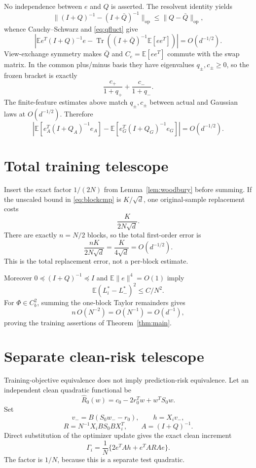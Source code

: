\documentclass[11pt]{article}
\newcommand{\E}{\mathbb E}
\newcommand{\op}{\mathrm{op}}
\newcommand{\tr}{\operatorname{Tr}}
\begin{document}
No independence between \(e\) and \(Q\) is asserted.  The resolvent identity yields
\[
 \|(I+Q)^{-1}-(I+\bar Q)^{-1}\|_{\op}\le\|Q-\bar Q\|_{\op},
\]
whence Cauchy--Schwarz and \eqref{eq:qfluct} give
\begin{equation}\label{eq:freeze}
 \left|\E e^T(I+Q)^{-1}e-
 \tr\left((I+\bar Q)^{-1}\E[ee^T]\right)\right|=O(d^{-1/2}).
\end{equation}
View-exchange symmetry makes \(\bar Q\) and \(C_e=\E[ee^T]\) commute with the swap matrix.  In the common plus/minus basis they have eigenvalues \(q_\pm,c_\pm\ge0\), so the frozen bracket is exactly
\[
 \frac{c_+}{1+q_+}+\frac{c_-}{1+q_-}.
\]
The finite-feature estimates above match \(q_\pm,c_\pm\) between actual and Gaussian laws at \(O(d^{-1/2})\).  Therefore
\begin{equation}\label{eq:blockcmp}
 \left|\E[e_A^T(I+Q_A)^{-1}e_A]
 -\E[e_G^T(I+Q_G)^{-1}e_G]\right|=O(d^{-1/2}).
\end{equation}

\section{Total training telescope}
Insert the exact factor \(1/(2N)\) from Lemma~\ref{lem:woodbury} before summing.  If the unscaled bound in \eqref{eq:blockcmp} is \(K/\sqrt d\), one original-sample replacement costs
\[
 \frac{K}{2N\sqrt d}.
\]
There are exactly \(n=N/2\) blocks, so the total first-order error is
\begin{equation}\label{eq:total}
 \boxed{\frac{nK}{2N\sqrt d}=\frac{K}{4\sqrt d}=O(d^{-1/2}).}
\end{equation}
This is the total replacement error, not a per-block estimate.

Moreover \(0\preceq(I+Q)^{-1}\preceq I\) and \(\E\|e\|^4=O(1)\) imply
\[
 \E(L_i^*-L_-^*)^2\le C/N^2.
\]
For \(\Phi\in C_b^2\), summing the one-block Taylor remainders gives
\[
 n\,O(N^{-2})=O(N^{-1})=O(d^{-1}),
\]
proving the training assertions of Theorem~\ref{thm:main}.

\section{Separate clean-risk telescope}
Training-objective equivalence does not imply prediction-risk equivalence.  Let an independent clean quadratic functional be
\[
 \widehat R_0(w)=c_0-2r_0^Tw+w^TS_0w.
\]
Set
\[
 v_-=B(S_0w_--r_0),\qquad h=X_iv_-,
\]
\[
 R=N^{-1}X_iBS_0BX_i^T,\qquad A=(I+Q)^{-1}.
\]
Direct substitution of the optimizer update gives the exact clean increment
\begin{equation}\label{eq:cleaninc}
 \boxed{\Gamma_i=\frac1N\{2e^TAh+e^TARAe\}.}
\end{equation}
The factor is \(1/N\), because this is a separate test quadratic.
\end{document}
